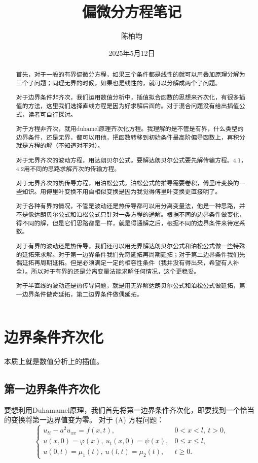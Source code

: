 \documentclass[12pt,a4paper]{article}
\title{偏微分方程笔记}
\author{陈柏均}
\date{2025年5月12日}
\numberwithin{subsection}{section}   %
\numberwithin{subsubsection}{subsection}
\theoremstyle{plain}
\theoremstyle{definition}
\theoremstyle{remark}
\theoremstyle{remark}
\begin{document}
	
	\maketitle

 \begin{abstract}
	 首先，对于一般的有界偏微分方程，如果三个条件都是线性的就可以用叠加原理分解为三个子问题；同理无界的时候，如果也是线性的，就可以分解成两个子问题。
	 
	 对于边界条件非齐次，我们运用数值分析中，插值拟合函数的思想来齐次化，有很多插值的方法，这里我们选择直线方程是因为好求解后面的。对于混合问题没有给出插值公式，读者可自行探讨。
	 
	 对于方程非齐次，就用duhamel原理齐次化方程。我理解的是不管是有界，什么类型的边界条件，还是无界，都可以用他，把函数转移到初始条件最高阶偏导函数上，再积分就是方程的解（不知道对不对）。
	 
	 对于无界齐次的波动方程，用达朗贝尔公式。要解达朗贝尔公式要先解传输方程。4.1，4.2用不同的思路求解齐次的传输方程。
	 
	 对于无界齐次的热传导方程，用泊松公式。泊松公式的推导需要卷积，傅里叶变换的一些知识。用傅里叶变换不用自相似变换是因为我觉得傅里叶变换更直接明了。
	 
	 对于各种有界的情况，不管是波动还是热传导都可以用分离变量法，他是一种思路，并不是像达朗贝尔公式和泊松公式只针对一类方程的通解。根据不同的边界条件做变化，得不同的解，但是它们思路都是一样，就是得通解之后，根据不同的边界条件来待定系数。
	 
	 对于有界的波动还是热传导，我们还可以用无界解达朗贝尔公式和泊松公式做一些特殊的延拓来求解。对于第一边界条件我们先奇延拓再周期延拓；对于第二边界条件我们先偶延拓再周期延拓。但是必须满足一定的相容性条件（我并没有得出来，希望有人补全）。所以对于有界的还是分离变量法能求解任何情况，这个更稳妥。
	 
	 对于半直线的波动还是热传导问题，就是用无界解达朗贝尔公式和泊松公式做延拓，第一边界条件做奇延拓，第二边界条件做偶延拓。
\end{abstract}


\newpage
	
	\tableofcontents  %
	
	
	\newpage
	
		\section{边界条件齐次化}
		本质上就是数值分析上的插值。
	\subsection{第一边界条件齐次化}
	要想利用Duhamamel原理，我们首先将第一边界条件齐次化，即要找到一个恰当的变换将第一边界值变为零。
	对于	(A) 方程问题：
	\begin{equation}\label{useq}
		\begin{cases}
			u_{tt} - a^2 u_{xx} = f(x, t), & 0 < x < l, \ t > 0, \\
			u(x, 0) = \varphi(x), \ u_t(x, 0) = \psi(x), & 0 \leq x \leq l, \\
			u(0, t) = \mu_1(t), \ u(l, t) = \mu_2(t), & t \geq 0.
		\end{cases}
	\end{equation}
	
\end{document}
